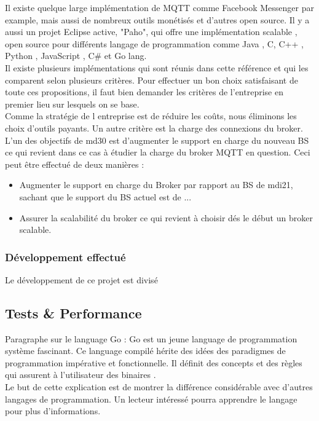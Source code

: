         Il existe quelque large implémentation de MQTT comme Facebook Messenger par example, mais aussi de nombreux 
        outils monétisés et d'autres open source.
        Il y a aussi un projet Eclipse active, "Paho", qui offre une implémentation scalable , open source pour 
        différents langage de programmation comme Java , 
        C, C++ , Python , JavaScript , C\# et Go lang. \\
        Il existe plusieurs implémentations qui sont réunis dans cette référence et qui les comparent selon plusieurs critères. 
        Pour effectuer un bon choix satisfaisant de toute ces propositions, il faut bien demander les critères de l'entreprise en premier lieu 
        sur lesquels on se base. \\ \break 
        Comme la stratégie de l entreprise est de réduire les coûts, nous éliminons les choix d'outils payants. 
        Un autre critère est la charge des connexions du broker. L'un des objectifs de \gls{md30} est d'augmenter le support 
        en charge du nouveau BS ce qui revient dans ce cas à étudier la charge du broker MQTT en question. 
        Ceci peut être effectué de deux manières : 
        \begin{itemize}
            \item Augmenter le support en charge du Broker par rapport au \gls{BS} de \gls{mdi21}, sachant que
            le support du BS actuel est de ... 
            \item Assurer la scalabilité du broker ce qui revient à choisir dés le début un broker scalable.
        \end{itemize}
        
        
        

         
           
        \pagebreak

        \subsubsection{Développement effectué}
            Le développement de ce projet est divisé 

    \subsection{Tests \& Performance}
       


    Paragraphe sur le language Go : 
    Go est un jeune language de programmation système
    fascinant. Ce language compilé hérite des idées des paradigmes de
    programmation impérative et fonctionnelle. Il définit des concepts et
    des règles qui assurent à l'utilisateur des binaires .\\[0.3cm]
   
  
    Le but de cette explication est de montrer la différence considérable
    avec d'autres langages de programmation. Un lecteur intéressé pourra
    apprendre le langage pour plus d'informations.

